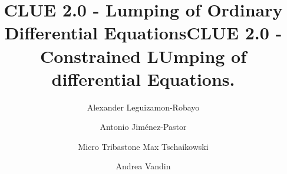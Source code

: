 \documentclass[a4paper,american]{llncs}
\begin{document}
\title{CLUE 2.0 - Lumping of Ordinary Differential Equations}


\author{
Alexander Leguizamon-Robayo  \and
Antonio Jim\'{e}nez-Pastor  \and
Micro Tribastone
Max Tschaikowski  \and
Andrea Vandin
}




%
%
%
%
%

\title{CLUE 2.0 - Constrained LUmping of differential Equations. }


\allowdisplaybreaks[0]

\maketitle
\end{document}
